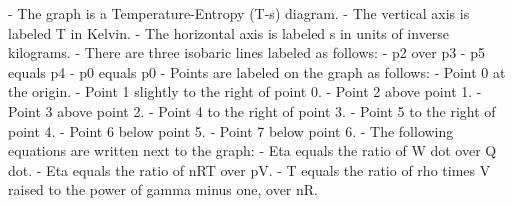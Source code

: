 - The graph is a Temperature-Entropy (T-s) diagram.
- The vertical axis is labeled T in Kelvin.
- The horizontal axis is labeled s in units of inverse kilograms.
- There are three isobaric lines labeled as follows:
  - p2 over p3
  - p5 equals p4
  - p0 equals p0
- Points are labeled on the graph as follows:
  - Point 0 at the origin.
  - Point 1 slightly to the right of point 0.
  - Point 2 above point 1.
  - Point 3 above point 2.
  - Point 4 to the right of point 3.
  - Point 5 to the right of point 4.
  - Point 6 below point 5.
  - Point 7 below point 6.
- The following equations are written next to the graph:
  - Eta equals the ratio of W dot over Q dot.
  - Eta equals the ratio of nRT over pV.
  - T equals the ratio of rho times V raised to the power of gamma minus one, over nR.